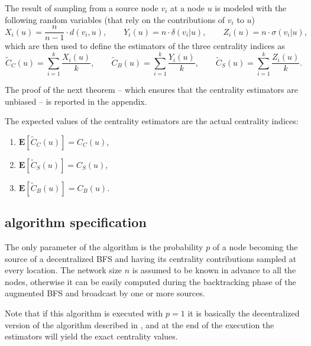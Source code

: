 The result of sampling from a source node $v_i$ at a node $u$ is modeled with the following random variables (that rely on the contributions of $v_i$ to $u$)
\begin{equation*}
X_i(u) = \frac{n}{n-1} \cdot d(v_i,u) , \qquad
Y_i(u) = n \cdot \delta(v_i|u) , \qquad
Z_i(u) = n \cdot \sigma(v_i|u) ,
\end{equation*}
which are then used to define the estimators of the three centrality indices as
\begin{equation*}
\widetilde{C}_C(u) = \sum_{i=1}^k \frac{X_i(u)}{k}, \qquad
\widetilde{C}_B(u) = \sum_{i=1}^k \frac{Y_i(u)}{k}, \qquad
\widetilde{C}_S(u) = \sum_{i=1}^k \frac{Z_i(u)}{k} .
\end{equation*}

The proof of the next theorem -- which ensures that the centrality estimators are unbiased -- is reported in the appendix.

\begin{theorem}
\label{th:expect}
The expected values of the centrality estimators are the actual centrality indices:
 \begin{enumerate}[label=\textup{(\alph*)}]
  \item $\mathbf{E}[\widetilde{C}_C(u)] = C_C(u)$,
  \item $\mathbf{E}[\widetilde{C}_S(u)] = C_S(u)$,
  \item $\mathbf{E}[\widetilde{C}_B(u)] = C_B(u)$.
  \end{enumerate}
\end{theorem}

\subsection{\multibfs{} algorithm specification}

The only parameter of the algorithm is the probability $p$ of a node becoming the source of a decentralized BFS and having its centrality contributions sampled at every location. The network size $n$ is assumed to be known in advance to all the nodes, otherwise it can be easily computed during the backtracking phase of the augmented BFS and broadcast by one or more sources.

\pagebreak
Note that if this algorithm is executed with $p=1$ it is basically the decentralized version of the algorithm described in \cite{brandes2001}, and at the end of the execution the estimators will yield the exact centrality values.

